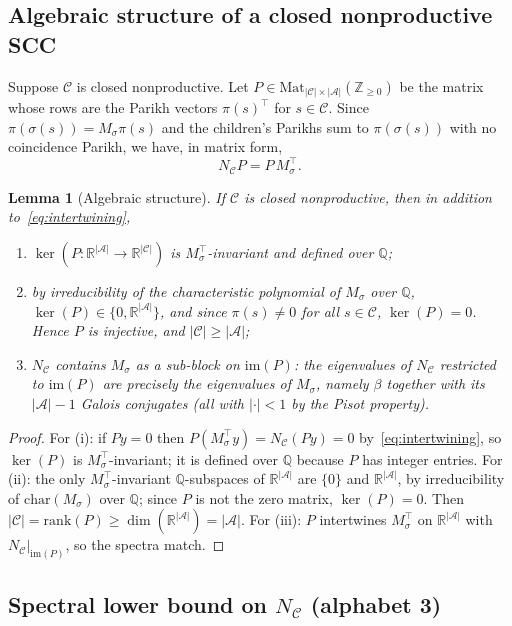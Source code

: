 \documentclass[11pt]{article}
\theoremstyle{plain}
\newtheorem{lemma}[theorem]{Lemma}
\theoremstyle{definition}
\theoremstyle{remark}
\newcommand{\Z}{\mathbb{Z}}
\newcommand{\Q}{\mathbb{Q}}
\newcommand{\R}{\mathbb{R}}
\newcommand{\A}{\mathcal{A}}
\newcommand{\C}{\mathcal{C}}
\begin{document}
\subsection{Algebraic structure of a closed nonproductive SCC}

Suppose $\C$ is closed nonproductive. Let $P\in\mathrm{Mat}_{|\C|\times|\A|}(\Z_{\ge 0})$ be the matrix whose rows are the Parikh vectors $\pi(s)^\top$ for $s\in\C$. Since $\pi(\sigma(s))=M_\sigma\pi(s)$ and the children's Parikhs sum to $\pi(\sigma(s))$ with no coincidence Parikh, we have, in matrix form,
\begin{equation}\label{eq:intertwining}
N_\C P=P\,M_\sigma^\top.
\end{equation}

\begin{lemma}[Algebraic structure]\label{lem:alg-structure}
If $\C$ is closed nonproductive, then in addition to~\eqref{eq:intertwining},
\begin{enumerate}[label=(\roman*)]
\item $\ker(P:\R^{|\A|}\to\R^{|\C|})$ is $M_\sigma^\top$-invariant and defined over $\Q$;
\item by irreducibility of the characteristic polynomial of $M_\sigma$ over $\Q$, $\ker(P)\in\{0,\R^{|\A|}\}$, and since $\pi(s)\ne 0$ for all $s\in\C$, $\ker(P)=0$. Hence $P$ is injective, and $|\C|\ge|\A|$;
\item $N_\C$ contains $M_\sigma$ as a sub-block on $\mathrm{im}(P)$: the eigenvalues of $N_\C$ restricted to $\mathrm{im}(P)$ are precisely the eigenvalues of $M_\sigma$, namely $\beta$ together with its $|\A|-1$ Galois conjugates (all with $|\cdot|<1$ by the Pisot property).
\end{enumerate}
\end{lemma}

\begin{proof}
For (i): if $Py=0$ then $P(M_\sigma^\top y)=N_\C(Py)=0$ by~\eqref{eq:intertwining}, so $\ker(P)$ is $M_\sigma^\top$-invariant; it is defined over $\Q$ because $P$ has integer entries. For (ii): the only $M_\sigma^\top$-invariant $\Q$-subspaces of $\R^{|\A|}$ are $\{0\}$ and $\R^{|\A|}$, by irreducibility of $\mathrm{char}(M_\sigma)$ over $\Q$; since $P$ is not the zero matrix, $\ker(P)=0$. Then $|\C|=\mathrm{rank}(P)\ge\dim(\R^{|\A|})=|\A|$. For (iii): $P$ intertwines $M_\sigma^\top$ on $\R^{|\A|}$ with $N_\C|_{\mathrm{im}(P)}$, so the spectra match.
\end{proof}

\subsection{Spectral lower bound on \texorpdfstring{$N_\C$}{NC} (alphabet 3)}\label{sec:v34-bound}
\end{document}

